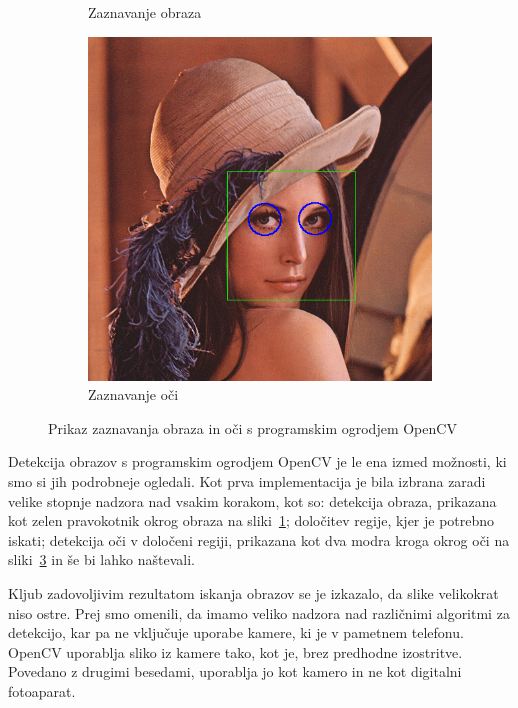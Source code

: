 \documentclass[a4paper, 12pt]{book}
\begin{document}
\begin{figure}[!ht]
\begin{subfigure}[b]{0.3\textwidth}
        \caption{Zaznavanje obraza}
        \label{fig:lena_opencv_face}
    \end{subfigure}
    \begin{subfigure}[b]{0.3\textwidth}
        \includegraphics[width=\textwidth]{lena_opencv_face_eye}
        \caption{Zaznavanje oči}
        \label{fig:lena_opencv_face_eye}
    \end{subfigure}
    \caption{Prikaz zaznavanja obraza in oči s programskim ogrodjem OpenCV}
\end{figure}

Detekcija obrazov s programskim ogrodjem OpenCV je le ena izmed možnosti, ki
smo si jih podrobneje ogledali. Kot prva implementacija je bila izbrana zaradi
velike stopnje nadzora nad vsakim korakom, kot so: detekcija obraza,
prikazana kot zelen pravokotnik okrog obraza na
sliki~\ref{fig:lena_opencv_face}; določitev regije, kjer je potrebno iskati;
detekcija oči v določeni regiji, prikazana kot dva modra kroga okrog oči
na sliki~\ref{fig:lena_opencv_face_eye} in še bi lahko naštevali.

Kljub zadovoljivim rezultatom iskanja obrazov se je izkazalo, da slike
velikokrat niso ostre. Prej smo omenili, da imamo veliko nadzora nad
različnimi algoritmi za detekcijo, kar pa ne vključuje uporabe kamere, ki je v
pametnem telefonu. OpenCV uporablja sliko iz kamere tako, kot je, brez
predhodne izostritve. Povedano z drugimi besedami, uporablja jo kot kamero in
ne kot digitalni fotoaparat.
\end{document}
